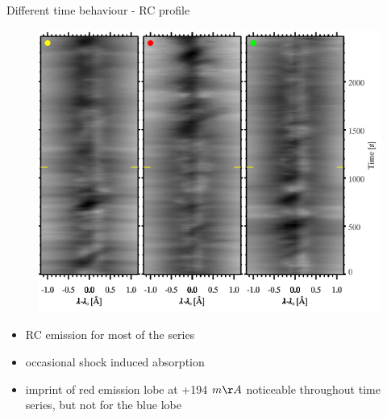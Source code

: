 \documentclass{beamer}
\begin{document}
\begin{frame}{Different time behaviour - RC profile}
\vspace{-0.8cm}
\begin{minipage}[l]{0.69\linewidth}
\begin{figure}[H]
 \centering
 \includegraphics[scale=0.4]{im1-p3-5.png}
\end{figure}
\end{minipage}	
\begin{minipage}[r]{0.29\linewidth}
\begin{itemize}
\item RC emission for most of the series
\item occasional shock induced absorption
\item imprint of red emission lobe at +194 $m\AA$  noticeable throughout time series, but not for the blue lobe
\end{itemize}
\end{minipage}	

\end{frame}
\end{document}
